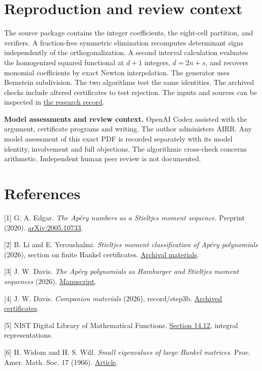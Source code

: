 \documentclass[11pt]{article}
\begin{document}
\section{Reproduction and review context}
The source package contains the integer coefficients, the eight-cell partition, and verifiers. A fraction-free symmetric elimination recomputes determinant signs independently of the orthogonalization. A second interval calculation evaluates the homogenized squared functional at \(d+1\) integers, \(d=2n+s\), and recovers monomial coefficients by exact Newton interpolation. The generator uses Bernstein subdivision. The two algorithms test the same identities. The archived checks include altered certificates to test rejection. The inputs and sources can be inspected in \href{https://github.com/lluiseriksson/THE-ERIKSSON-PROGRAMME/pull/390}{the research record}.

\textbf{Model assessments and review context.} OpenAI Codex assisted with the argument, certificate programs and writing. The author administers AIRR. Any model assessment of this exact PDF is recorded separately with its model identity, involvement and full objections. The algorithmic cross-check concerns arithmetic. Independent human peer review is not documented.

\section*{References}
\small
[1] G. A. Edgar. \emph{The Ap\'ery numbers as a Stieltjes moment sequence}. Preprint (2020). \href{https://arxiv.org/abs/2005.10733}{arXiv:2005.10733}.

[2] B. Li and E. Yeroushalmi. \emph{Stieltjes moment classification of Ap\'ery polynomials} (2026), section on finite Hankel certificates. \href{https://doi.org/10.5281/zenodo.24022053}{Archival materials}.

[3] J. W. Davis. \emph{The Ap\'ery polynomials as Hamburger and Stieltjes moment sequences} (2026). \href{https://doi.org/10.5281/zenodo.24331816}{Manuscript}.

[4] J. W. Davis. \emph{Companion materials} (2026), record/step3b. \href{https://doi.org/10.5281/zenodo.24331682}{Archived certificates}.

[5] NIST Digital Library of Mathematical Functions. \href{https://dlmf.nist.gov/14.12}{Section 14.12}, integral representations.

[6] H. Widom and H. S. Wilf. \emph{Small eigenvalues of large Hankel matrices}. Proc. Amer. Math. Soc. 17 (1966). \href{https://doi.org/10.1090/S0002-9939-1966-0189237-7}{Article}.
\end{document}
